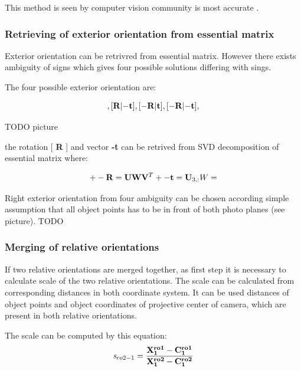 \documentclass[a4paper,12pt]{report}
\newcommand{\ematr}[1]{
{\bf #1}
}
\newcommand{\evect}[1]{
{\bf #1}
}
\newcommand{\escal}[1]{
{\it #1}
}
\begin{document}
This method is seen by computer vision community is most accurate \cite[p. 315]{Hartley2004}.  

\subsubsection{Retrieving of exterior orientation from essential matrix}
\label{sec:ess_eo}
Exterior orientation
can be retrivred from essential matrix. However there exists ambiguity of signs which gives 
four possible solutions differing with sings.

The four possible exterior orientation are:

\begin{equation}
[\ematr{R}|\evect{t}],
[\ematr{R}|\evect{-t}],
[\ematr{-R}|\evect{t}],
[\ematr{-R}|\evect{-t}],
\end{equation}

TODO picture

the rotation [\ematr{R}] and vector \evect{-t} can be retrived from SVD decomposition of essential matrix 
where:

\begin{equation}
+- \ematr{R} = \ematr{U}  \ematr{W} \ematr{V}^{T}
+- \evect{t} = \evect{U}_{3,:}
W = 
\end{equation}


Right exterior orientation from four ambiguity can be chosen according simple assumption that all object points has to be in front
of both photo planes (see picture).
TODO


\subsubsection{Merging of relative orientations}
\label{sec:ess_chain}

If two relative orientations are merged together, as first step it is necessary to calculate scale of the two relative orientations.
The scale can be calculated from corresponding distances in both coordinate system. 
It can be used distances of 
object points and object coordinates of projective center of camera, which are present in both relative orientations.

The scale can be computed by this equation:
\begin{equation}
\escal{s}_{ro2-1} = \frac{\mathbf{\evect{X}^{ro1}_{1} - \evect{C^{ro1}_{1}}}}
	                {\mathbf{\evect{X}^{ro2}_{1} - \evect{C^{ro2}_{1}}}}
\end{equation}
\end{document}

